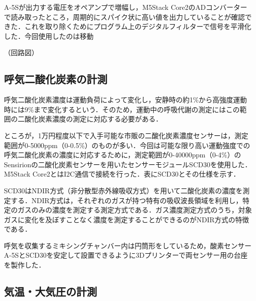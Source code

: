 A-5Sが出力する電圧をオペアンプで増幅し，M5Stack Core2のADコンバーターで読み取ったところ，周期的にスパイク状に高い値を出力していることが確認できた．これを取り除くためにプログラム上のデジタルフィルターで信号を平滑化した．今回使用したのは移動

（回路図）

\subsection{呼気二酸化炭素の計測}

呼気二酸化炭素濃度は運動負荷によって変化し，安静時の約1\%から高強度運動時には9\%まで変化するという\cite{co2_percent}．そのため，運動中の呼吸代謝の測定にはこの範囲の二酸化炭素濃度の測定に対応する必要がある．

ところが，1万円程度以下で入手可能な市販の二酸化炭素濃度センサーは，測定範囲が0-5000ppm（0-0.5\%）のものが多い．今回は可能な限り高い運動強度での呼気二酸化炭素の濃度に対応するために，測定範囲が0-40000ppm（0-4\%）のSensirionの二酸化炭素センサーを用いたセンサーモジュールSCD30を使用した．M5Stack Core2とはI2C通信で接続を行った．表にSCD30とその仕様を示す．

SCD30はNDIR方式（非分散型赤外線吸収方式）を用いて二酸化炭素の濃度を測定する．NDIR方式は，それぞれのガスが持つ特有の吸収波長領域を利用し，特定のガスのみの濃度を測定する測定方式である．ガス濃度測定方式のうち，対象ガスに変化を及ぼすことなく濃度を測定することができるのがNDIR方式の特徴である\cite{whats_ndir}．

呼気を収集するミキシングチャンバー内は円筒形をしているため，酸素センサーA-5SとSCD30を安定して設置できるように3Dプリンターで両センサー用の台座を製作した．



\subsection{気温・大気圧の計測}

